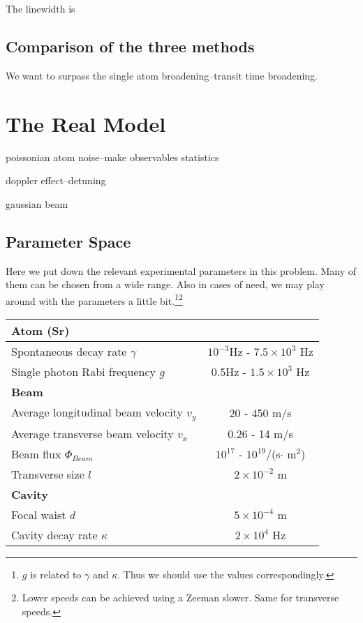 \documentclass{article}
\begin{document}
The linewidth is

\subsection{Comparison of the three methods}
We want to surpass the single atom broadening--transit time broadening.

\section{The Real Model}
\label{section:real}

poissonian atom noise--make observables statistics

doppler effect--detuning

gaussian beam

\subsection{Parameter Space}
Here we put down the relevant experimental parameters in this problem. Many of them can be chosen from a wide range. Also in cases of need, we may play around with the parameters a little bit.\footnote{$g$ is related to $\gamma$ and $\kappa$. Thus we should use the values correspondingly.}\footnote{Lower speeds can be achieved using a Zeeman slower. Same for transverse speeds.}
\begin{center}
\begin{tabular}{ |l |c|   }
\hline
\textbf{Atom (Sr)} & \\\hline
Spontaneous decay rate $\gamma$ & $10^{-3}$Hz - $7.5\times10^3$ Hz \\\hline
Single photon Rabi frequency $g$ & $0.5$Hz - $1.5\times 10^3$ Hz\\\hline
\textbf{Beam} & \\\hline
Average longitudinal beam velocity $v_y$ & 20 - 450 m/s\\\hline
Average transverse beam velocity $v_x$  & 0.26 - 14 m/s\\\hline
Beam flux $\Phi_{Beam}$  & $10^{17}$ - $10^{19}$/(s$\cdot$ m$^2$)\\\hline
Transverse size $l$ & $2\times10^{-2}$ m\\\hline
\textbf{Cavity} & \\\hline
Focal waist $d$  & $5\times10^{-4}$ m\\\hline
Cavity decay rate $\kappa$ & $2\times10^4$ Hz\\\hline
\end{tabular}
\end{center}
\end{document}
